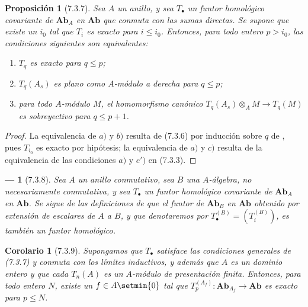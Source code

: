 \documentclass[10pt,oneside,openany]{book}
\theoremstyle{egaenv}\newtheorem*{env}{---}
\theoremstyle{egastatement}
\newtheorem*{proposition}{Proposición}
\newtheorem*{corollary}{Corolario}
\theoremstyle{egadescription}
\newcommand{\oldpage}[2][]{\marginnote{\normalfont\scriptsize\textbf{#1}\,|\,#2}\ignorespaces}
\renewcommand{\leq}{\leqslant}
\begin{document}
\begin{proposition}[7.3.7]
\label{III.7.3.7}
Sea $A$ un anillo, y sea $T_\bullet$ un funtor homológico
covariante de $\boldsymbol{Ab}_A$ en $\boldsymbol{Ab}$ que conmuta con las
sumas directas. Se supone que existe un $i_0$ tal que $T_i$ es
exacto para $i\leq i_0$. Entonces, para todo entero $p>i_0$, las
condiciones siguientes son equivalentes:
\begin{enumerate}
  \item[(a)] $T_q$ es exacto para $q\leq p$;
  \item[(b)] $T_q(A_s)$ es plano como $A$-módulo a derecha para
    $q\leq p$;
  \item[(c)] para todo $A$-módulo $M$, el homomorfismo canónico
    $T_q(A_s)\otimes_A M\longrightarrow T_q(M)$
    es sobreyectivo para $q\leq p+1$.
\end{enumerate}
\end{proposition}

\begin{proof}
La equivalencia de $a)$ y $b)$ resulta de (7.3.6) por inducción sobre $q$ de
, pues $T_{i_0}$ es exacto por hipótesis; la equivalencia de $a)$ y $c)$
resulta de la equivalencia de las condiciones $a)$ y $e')$ en (7.3.3).
\end{proof}

\oldpage[III]{184}

\begin{env}[7.3.8]
\label{III.7.3.8}
Sea $A$ un anillo conmutativo, sea $B$ una $A$-álgebra, no
necesariamente conmutativa, y sea $T_\bullet$ un funtor homológico
covariante de $\boldsymbol{Ab}_A$ en $\boldsymbol{Ab}$. Se sigue de las
definiciones de  que el funtor de $\boldsymbol{Ab}_B$ en
$\boldsymbol{Ab}$ obtenido por extensión de escalares de $A$ a $B$, y que denotaremos por $T_\bullet^{(B)}=(T_i^{(B)})$,
es también un funtor \emph{homológico}.
\end{env}

\begin{corollary}[7.3.9]
\label{III.7.3.9}
Supongamos que $T_\bullet$ satisface las condiciones generales de \textup{(7.3.7)} y conmuta con los límites inductivos, y además que $A$ es un dominio entero y que cada $T_n(A)$ es un
$A$-módulo de presentación finita. Entonces, para todo entero $N$,
existe un $f\in A\setmin\{0\}$ tal que
$T_p^{(A_f)}:\boldsymbol{Ab}_{A_f}\longrightarrow\boldsymbol{Ab}$
es exacto para $p\leq N$.
\end{corollary}
\end{document}
